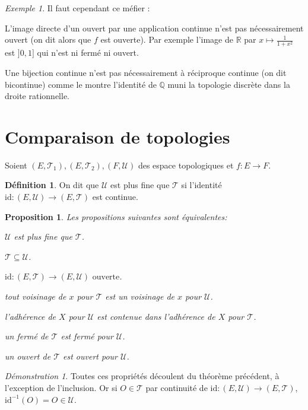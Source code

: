 \documentclass[a4paper, 11pt, french]{book}
\newenvironment{itemise}{\itemize}{\enditemize}
\theoremstyle{plain} %
\newtheorem{proposition}{Proposition}
\theoremstyle{definition} %
\newtheorem{definition}{Définition}
\theoremstyle{remark} %
\newtheorem{exemple}{Exemple}
\newtheorem*{demonstration}{Démonstration}
\newcommand{\1}{\mathds{1}}
\newcommand{\id}{\mathrm{id}}
\newcommand{\inv}[1]{#1^{-1}}
\newcommand{\Q}{\mathbb{Q}}
\newcommand{\R}{\mathbb{R}}
\begin{document}
\begin{exemple}
	Il faut cependant ce méfier :
	\begin{itemise}
		\item L'image directe d'un ouvert par une application continue n'est pas nécessairement ouvert (on dit alors que $f$ est ouverte).
		Par exemple l'image de $\R$ par $x\mapsto\frac{1}{1+x^2}$ est $]0,1]$ qui n'est ni fermé ni ouvert.
		\item Une bijection continue n'est pas nécessairement à réciproque continue (on dit bicontinue) comme le montre l'identité de $\Q$ muni la topologie discrète dans la droite rationnelle.
	\end{itemise}
\end{exemple}

\section{Comparaison de topologies}

Soient $(E, \mathscr{T}_1), (E, \mathscr{T}_2), (F, \mathscr{U})$ des espace topologiques et $f\colon E\rightarrow F$.

\begin{definition}
	On dit que $\mathscr{U}$ est plus fine que $\mathscr{T}$ si l'identité $\id\colon(E, \mathscr{U})\rightarrow(E, \mathscr{T})$ est continue.
\end{definition}

\begin{proposition}
	Les propositions suivantes sont équivalentes:
	\begin{itemise}
		\item $\mathscr{U}$ est plus fine que $\mathscr{T}$.
		\item $\mathscr{T}\subseteq\mathscr{U}$.
		\item $\id\colon(E, \mathscr{T})\rightarrow(E, \mathscr{U})\text{ ouverte}$.
		\item tout voisinage de $x$ pour $\mathscr{T}$ est un voisinage de $x$ pour $\mathscr{U}$.
		\item l'adhérence de $X$ pour $\mathscr{U}$ est contenue dans l'adhérence de $X$ pour $\mathscr{T}$.
		\item un fermé de $\mathscr{T}$ est fermé pour $\mathscr{U}$.
		\item un ouvert de $\mathscr{T}$ est ouvert pour $\mathscr{U}$.
	\end{itemise}
\end{proposition}

\begin{demonstration}
	Toutes ces propriétés découlent du théorème précédent, à l'exception de l'inclusion.
	Or si $O\in\mathscr{T}$ par continuité de $\id\colon(E, \mathscr{U})\rightarrow(E, \mathscr{T})$, $\inv{\id}(O)=O\in\mathscr{U}$.
\end{demonstration}
\end{document}
